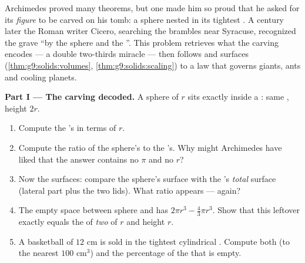\begin{problem}
\label{pb:g9:solids:1}
Archimedes proved many theorems, but one made him so proud that
he asked for its \emph{figure} to be carved on his tomb: a sphere
nested in its tightest . A century later the Roman writer
Cicero, searching the brambles near Syracuse, recognized the
grave ``by the sphere and the ''. This problem retrieves
what the carving encodes --- a double two-thirds miracle --- then
follows  and surfaces (\cref{thm:g9:solids:volumes},
\cref{thm:g9:solids:scaling}) to a law that governs giants, ants
and cooling planets.

\medskip
\noindent\textbf{Part I --- The carving decoded.}
A sphere of  $r$ sits exactly inside a : same
, height $2r$.
\begin{enumerate}
  \item Compute the 's  in terms of $r$.
  \item Compute the ratio of the sphere's  to the
        's. Why might Archimedes have liked that the
        answer contains no $\pi$ and no $r$?
  \item Now the surfaces: compare the sphere's surface  with
        the 's \emph{total} surface (lateral part plus
        the two lids). What ratio appears --- again?
  \item The empty space between sphere and  has 
        $2\pi r^3 - \frac43\pi r^3$. Show that this leftover
        exactly equals the  of \emph{two } of 
        $r$ and height $r$.
  \item A basketball of  $12$ cm is sold in the tightest
        cylindrical . Compute both  (to the nearest
        $100$ cm$^3$) and the percentage of the  that is
        empty.
\end{enumerate}


\end{problem}
